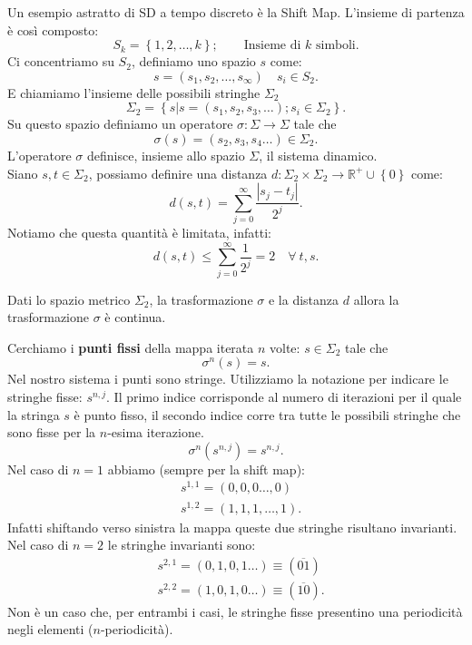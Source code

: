 \begin{exmp}
    Un esempio astratto di SD a tempo discreto è la Shift Map. L'insieme di partenza è così composto:
    \[
	S_k = \left\{1, 2, \ldots, k\right\}; \qquad \text{Insieme di $k$ simboli}
    .\] 
    Ci concentriamo su $S_2$, definiamo uno spazio $s$ come:
    \[
        s = \left(s_1, s_2, \ldots, s_{\infty}\right) \quad s_i \in S_2
    .\] 
    E chiamiamo l'insieme delle possibili stringhe $\Sigma_2$ 
    \[
        \Sigma_2 = \left\{s | s = \left(s_1, s_2 , s_3, \ldots\right); s_i \in \Sigma_2\right\}
    .\] 
    Su questo spazio definiamo un operatore $\sigma: \Sigma\to \Sigma$ tale che
    \[
	\sigma (s) = \left(s_2, s_3, s_4\ldots\right) \in \Sigma_2
    .\] 
    L'operatore $\sigma$ definisce, insieme allo spazio $\Sigma$,  il sistema dinamico.\\
    Siano $s, t \in \Sigma_2$, possiamo definire una distanza $d: \Sigma_2\times \Sigma_2\to \mathbb{R}^+ \cup \left\{0\right\}$ come:
    \[
	d(s, t) = \sum_{j=0}^{\infty} \frac{\left|s_j-t_j\right|}{2^j}
    .\] 
    Notiamo che questa quantità è limitata, infatti:
    \[
	d(s, t) \le \sum_{j=0}^{\infty} \frac{1}{2^j} = 2 \quad \forall \ t, s
    .\] 
    \begin{thm}
	Dati lo spazio metrico $\Sigma_2$, la trasformazione $\sigma$ e la distanza $d$ allora la trasformazione $\sigma$ è continua.
    \end{thm}
    \noindent
    Cerchiamo i \textbf{punti fissi} della mappa iterata $n$ volte: $s \in \Sigma_2$ tale che
    \[
	\sigma^n(s) = s
    .\] 
    Nel nostro sistema i punti sono stringe. Utilizziamo la notazione per indicare le stringhe fisse: $s^{n, j}$. Il primo indice corrisponde al numero di iterazioni per il quale la stringa $s$ è punto fisso, il secondo indice corre tra tutte le possibili stringhe che sono fisse per la $n$-esima iterazione.
    \[
	\sigma^n(s^{n,j}) = s^{n,j} 
    .\] 
    Nel caso di $n=1$ abbiamo (sempre per la shift map):
    \[\begin{aligned}
	&s^{1,1} = (0,0,0\ldots,0)\\
	&s^{1,2} = (1,1,1,\ldots,1)
    .\end{aligned}\]
    Infatti shiftando verso sinistra la mappa queste due stringhe risultano invarianti.\\
    Nel caso di $n=2$  le stringhe invarianti sono:
    \[\begin{aligned}
	&s^{2,1} = (0,1,0,1\ldots) \equiv (\overline{01})\\
	&s^{2,2} = (1,0,1,0\ldots) \equiv (\overline{10})
    .\end{aligned}\]
    Non è un caso che, per entrambi i casi, le stringhe fisse presentino una periodicità negli elementi ($n$-periodicità).
\end{exmp}
\noindent
